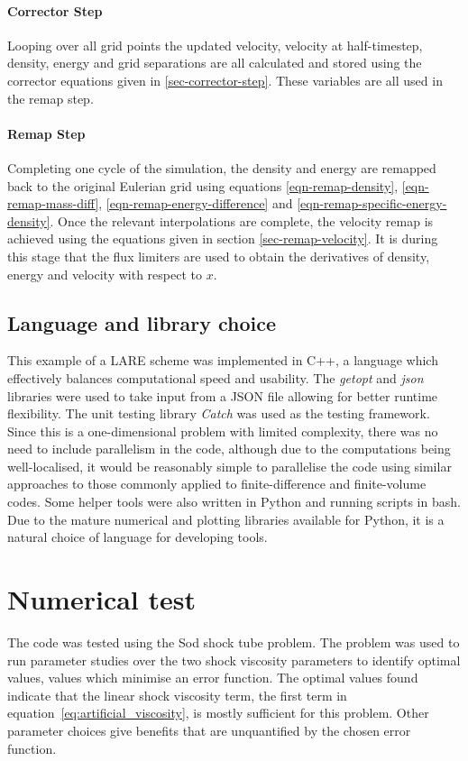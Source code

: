 \paragraph{Corrector Step}
Looping over all grid points the updated velocity, velocity at half-timestep, density, energy and grid separations are all calculated and stored using the corrector equations given in \ref{sec-corrector-step}. These variables are all used in the remap step.

\paragraph{Remap Step}
Completing one cycle of the simulation, the density and energy are remapped back to the original Eulerian grid using equations \eqref{eqn-remap-density}, \eqref{eqn-remap-mass-diff}, \eqref{eqn-remap-energy-difference} and \eqref{eqn-remap-specific-energy-density}. Once the relevant interpolations are complete, the velocity remap is achieved using the equations given in section \ref{sec-remap-velocity}. It is during this stage that the flux limiters are used to obtain the derivatives of density, energy and velocity with respect to $x$.

\subsection{Language and library choice}
This example of a LARE scheme was implemented in C++, a language which effectively balances computational speed and usability. The \emph{getopt} and \emph{json} libraries were used to take input from a JSON file allowing for better runtime flexibility. The unit testing library \emph{Catch} was used as the testing framework. Since this is a one-dimensional problem with limited complexity, there was no need to include parallelism in the code, although due to the computations being well-localised, it would be reasonably simple to parallelise the code using similar approaches to those commonly applied to finite-difference and finite-volume codes. Some helper tools were also written in Python and running scripts in bash. Due to the mature numerical and plotting libraries available for Python, it is a natural choice of language for developing tools.

\section{Numerical test}

The code was tested using the Sod shock tube problem. The problem was used to run parameter studies over the two shock viscosity parameters to identify optimal values, values which minimise an error function. The optimal values found indicate that the linear shock viscosity term, the first term in equation~\ref{eq:artificial_viscosity}, is mostly sufficient for this problem. Other parameter choices give benefits that are unquantified by the chosen error function.

